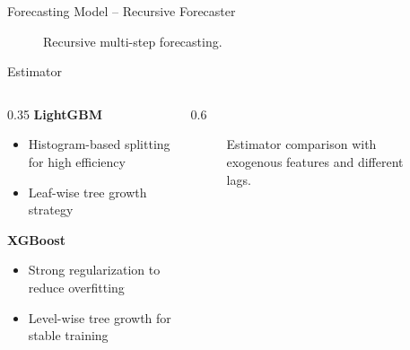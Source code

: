 \documentclass[10pt, aspectratio=169]{beamer}
\begin{document}
\begin{frame}{Forecasting Model -- Recursive Forecaster}
    \begin{figure}
        \centering
        
        \caption{Recursive multi-step forecasting.}
        \label{fig:recursive_forecasting}
    \end{figure}
\end{frame}

\begin{frame}{Estimator}
    \begin{columns}[onlytextwidth]
        \begin{column}{0.35\textwidth}
            \textbf{LightGBM}
            \begin{itemize}
                \item Histogram-based splitting for high efficiency
                \item Leaf-wise tree growth strategy~\cite{shi_2025_lightgbm}
            \end{itemize}
        
            \textbf{XGBoost}
            \begin{itemize}
                \item Strong regularization to reduce overfitting
                \item Level-wise tree growth for stable training~\cite{chen_2016_xgboost}
            \end{itemize}
        \end{column}
        \begin{column}{0.6\textwidth}
            \centering
            \begin{figure}
                \centering
                
                \caption{Estimator comparison with exogenous features and different lags.}
                \label{fig:estimators}
            \end{figure}
        \end{column}
    \end{columns}
\end{frame}
\end{document}

